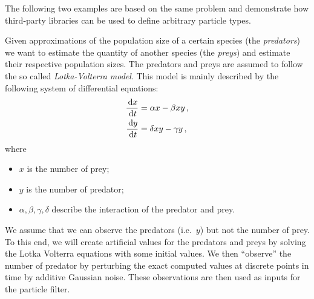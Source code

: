 The following two examples are based on the same problem and
demonstrate how third-party libraries can be used to define arbitrary
particle types.

\begin{example}\label{ex:lv1}
  Given approximations of the population size of a certain species
  (the \emph{predators}) we want to estimate the quantity of another
  species (the \emph{preys}) and estimate their respective population
  sizes. The predators and preys are assumed to follow the so called
  \emph{Lotka-Volterra model}. This model is mainly described by the
  following system of differential equations:
  \begin{equation}
    \label{eq:lotka}
    \begin{aligned}
      \frac{\,\mathrm{d}x}{\,\mathrm{d}t} &= \alpha x - \beta xy \,, \\
      \frac{\,\mathrm{d}y}{\,\mathrm{d}t} &= \delta xy - \gamma y \,,
    \end{aligned}
  \end{equation}
  where
  \begin{itemize}
  \item $x$ is the number of prey;
  \item $y$ is the number of predator;
  \item $\alpha, \beta, \gamma, \delta$ describe the interaction of
    the predator and prey.
  \end{itemize}
  We assume that we can observe the predators (i.e.\ $y$) but not the
  number of prey. To this end, we will create artificial values for
  the predators and preys by solving the Lotka Volterra equations with
  some initial values. We then ``observe'' the number of predator by
  perturbing the exact computed values at discrete points in time by
  additive Gaussian noise. These observations are then used as inputs
  for the particle filter.


\end{example}
